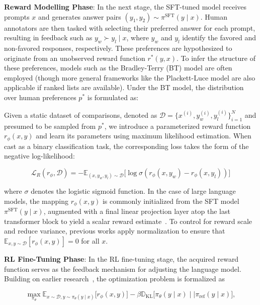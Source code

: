 \textbf{Reward Modelling Phase}: In the next stage, the SFT-tuned model receives prompts $x$ and generates answer pairs $(y_1, y_2)\sim \pi^\text{SFT}(y \mid x)$. Human annotators are then tasked with selecting their preferred answer for each prompt, resulting in feedback such as $y_w\succ y_l \mid x$, where $y_w$ and $y_l$ identify the favored and non-favored responses, respectively. These preferences are hypothesized to originate from an unobserved reward function $r^*(y, x)$. To infer the structure of these preferences, models such as the Bradley-Terry (BT) model \cite{bradley1952rankanalysis} are often employed (though more general frameworks like the Plackett-Luce model \citep{plackett1975analysis, luce2012individual} are also applicable if ranked lists are available). Under the BT model, the distribution over human preferences $p^*$ is formulated as:

Given a static dataset of comparisons, denoted as $\mathcal{D}=\bigl\{x^{(i)}, y_w^{(i)}, y_l^{(i)}\bigr\}_{i=1}^N$ and presumed to be sampled from $p^*$, we introduce a parameterized reward function $r_{\phi}(x, y)$ and learn its parameters using maximum likelihood estimation. When cast as a binary classification task, the corresponding loss takes the form of the negative log-likelihood:

\begin{equation}\label{eq:reward_model}
    \mathcal{L}_R(r_{\phi}, \mathcal{D}) = -\mathbb{E}_{(x, y_w, y_l)\sim \mathcal{D}}\bigl[\log \sigma(r_{\phi}(x, y_w)- r_{\phi}(x, y_l))\bigr]
\end{equation}

where $\sigma$ denotes the logistic sigmoid function. In the case of large language models, the mapping $r_{\phi}(x, y)$ is commonly initialized from the SFT model $\pi^\text{SFT}(y \mid x)$, augmented with a final linear projection layer atop the last transformer block to yield a scalar reward estimate~\cite{ziegler2020finetuning}. To control for reward scale and reduce variance, previous works apply normalization to ensure that $\mathbb{E}_{x,y\sim \mathcal{D}}\left[r_\phi(x, y)\right] = 0$ for all $x$.

\textbf{RL Fine-Tuning Phase}: In the RL fine-tuning stage, the acquired reward function serves as the feedback mechanism for adjusting the language model. Building on earlier research~\citep{jaques2017sequence, jaques2020human}, the optimization problem is formalized as

\begin{equation}\label{eq:RL}
\max_{\pi_{\theta}}  \mathbb{E}_{x\sim \mathcal{D}, y\sim \pi_{\theta}(y \mid x)}\bigl[r_{\phi}(x, y)\bigr] - \beta\mathbb{D}_{\textrm{KL}}\bigl[\pi_{\theta}(y\mid x)\mid \mid \pi_\text{ref}(y\mid x)\bigr],
\end{equation}

